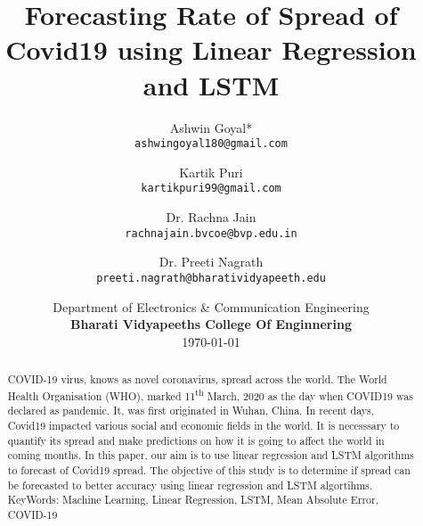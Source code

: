 \documentclass[11pt]{article}
\title{Forecasting Rate of Spread of Covid19 using Linear Regression and LSTM}
\author{Ashwin Goyal*\\ \texttt{ashwingoyal180@gmail.com} \\
	 \and
	  Kartik Puri\\ \texttt{kartikpuri99@gmail.com}
	 \and
	Dr. Rachna Jain\\ \texttt{rachnajain.bvcoe@bvp.edu.in}
	 \and
	Dr. Preeti Nagrath\\ \texttt{preeti.nagrath@bharatividyapeeth.edu} \\
  }
\date{\small{Department of Electronics \& Communication Engineering} \\ \textbf{Bharati
Vidyapeeths College Of Enginnering}  \\ \today}
\begin{document}
\maketitle
\begin{abstract}
	COVID-19 virus, knows as novel coronavirus, spread across
	the world. The World Health Organisation (WHO), marked
	11\textsuperscript{th} March, 2020 as the day when COVID19 was
	declared as pandemic. It, was first
	originated in Wuhan, China.
	In recent days, Covid19 impacted various
	social and economic fields in the world.
	It is necesssary to
	quantify its spread and make predictions on how it is going to
	affect the world in coming months.
	In this paper, our aim is to use linear
	regression and LSTM algorithms to forecast of Covid19 spread.
	The objective of this study is to determine if spread can be
	forecasted to better accuracy using linear regression and LSTM
	algortihms.
	 \\

	KeyWords: Machine Learning, Linear Regression, LSTM, Mean
	Absolute Error, COVID-19
	\\
	\\
\end{abstract}



\printbibliography
\end{document}
